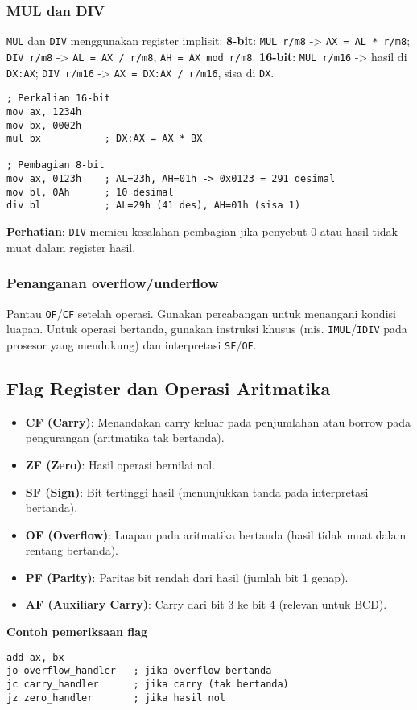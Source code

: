\subsubsection{MUL dan DIV}
\texttt{MUL} dan \texttt{DIV} menggunakan register implisit:\newline
\textbf{8-bit}: \texttt{MUL r/m8} -> \texttt{AX = AL * r/m8}; \texttt{DIV r/m8} -> \texttt{AL = AX / r/m8}, \texttt{AH = AX mod r/m8}.\newline
\textbf{16-bit}: \texttt{MUL r/m16} -> hasil di \texttt{DX:AX}; \texttt{DIV r/m16} -> \texttt{AX = DX:AX / r/m16}, sisa di \texttt{DX}.
\begin{verbatim}
; Perkalian 16-bit
mov ax, 1234h
mov bx, 0002h
mul bx           ; DX:AX = AX * BX

; Pembagian 8-bit
mov ax, 0123h    ; AL=23h, AH=01h -> 0x0123 = 291 desimal
mov bl, 0Ah      ; 10 desimal
div bl           ; AL=29h (41 des), AH=01h (sisa 1)
\end{verbatim}
\textbf{Perhatian}: \texttt{DIV} memicu kesalahan pembagian jika penyebut 0 atau hasil tidak muat dalam register hasil.

\subsubsection{Penanganan overflow/underflow}
Pantau \texttt{OF}/\texttt{CF} setelah operasi. Gunakan percabangan untuk menangani kondisi luapan. Untuk operasi bertanda, gunakan instruksi khusus (mis. \texttt{IMUL}/\texttt{IDIV} pada prosesor yang mendukung) dan interpretasi \texttt{SF}/\texttt{OF}.

\subsection{Flag Register dan Operasi Aritmatika}
\begin{itemize}
  \item \textbf{CF (Carry)}: Menandakan carry keluar pada penjumlahan atau borrow pada pengurangan (aritmatika tak bertanda).
  \item \textbf{ZF (Zero)}: Hasil operasi bernilai nol.
  \item \textbf{SF (Sign)}: Bit tertinggi hasil (menunjukkan tanda pada interpretasi bertanda).
  \item \textbf{OF (Overflow)}: Luapan pada aritmatika bertanda (hasil tidak muat dalam rentang bertanda).
  \item \textbf{PF (Parity)}: Paritas bit rendah dari hasil (jumlah bit 1 genap).
  \item \textbf{AF (Auxiliary Carry)}: Carry dari bit 3 ke bit 4 (relevan untuk BCD).
\end{itemize}
\noindent\textbf{Contoh pemeriksaan flag}
\begin{verbatim}
add ax, bx
jo overflow_handler   ; jika overflow bertanda
jc carry_handler      ; jika carry (tak bertanda)
jz zero_handler       ; jika hasil nol
\end{verbatim}

